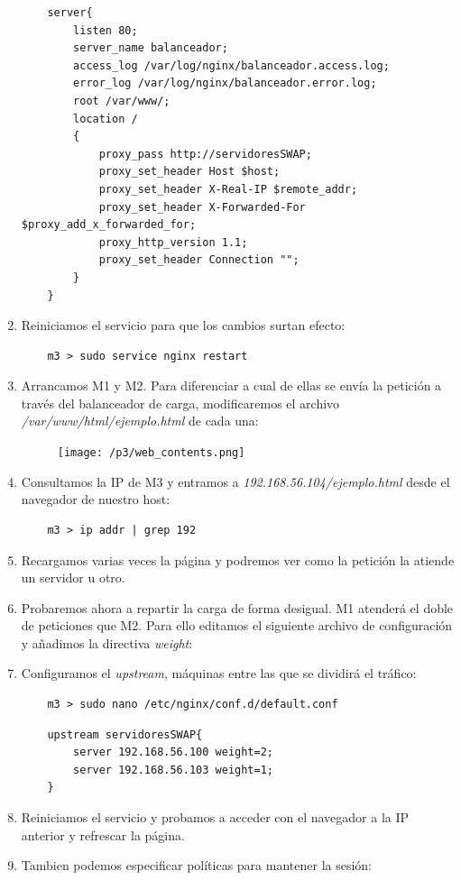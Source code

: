 \documentclass[12pt,spanish]{article}
\begin{document}
\begin{enumerate}
\begin{lstlisting}
	server{
		listen 80;
		server_name balanceador;
		access_log /var/log/nginx/balanceador.access.log;
		error_log /var/log/nginx/balanceador.error.log;
		root /var/www/;
		location /
		{
			proxy_pass http://servidoresSWAP;
			proxy_set_header Host $host;
			proxy_set_header X-Real-IP $remote_addr;
			proxy_set_header X-Forwarded-For $proxy_add_x_forwarded_for;
			proxy_http_version 1.1;
			proxy_set_header Connection "";
		}
	}
		\end{lstlisting}
		\item Reiniciamos el servicio para que los cambios surtan efecto:
		\begin{lstlisting}
	m3 > sudo service nginx restart
		\end{lstlisting}
		\item Arrancamos M1 y M2. Para diferenciar a cual de ellas se envía la petición a través del balanceador de carga, modificaremos el archivo \emph{/var/www/html/ejemplo.html} de cada una:
		\begin{figure}[H]
			\centering
			\texttt{[image: /p3/web\_contents.png]}
		\end{figure}
		\item Consultamos la IP de M3 y entramos a \emph{192.168.56.104/ejemplo.html} desde el navegador de nuestro host:
		\begin{lstlisting}
	m3 > ip addr | grep 192
		\end{lstlisting}
		\item Recargamos varias veces la página y podremos ver como la petición la atiende un servidor u otro.
		\item Probaremos ahora a repartir la carga de forma desigual. M1 atenderá el doble de peticiones que M2. Para ello editamos el siguiente archivo de configuración y añadimos la directiva \emph{weight}:
		\item Configuramos el \emph{upstream}, máquinas entre las que se dividirá el tráfico:
		\begin{lstlisting}
	m3 > sudo nano /etc/nginx/conf.d/default.conf
		\end{lstlisting}
		\begin{lstlisting}
	upstream servidoresSWAP{
		server 192.168.56.100 weight=2;
		server 192.168.56.103 weight=1;
	}
		\end{lstlisting}
		\item Reiniciamos el servicio y probamos a acceder con el navegador a la IP anterior y refrescar la página.
		\item Tambien podemos especificar políticas para mantener la sesión:

\end{enumerate}
\end{document}
